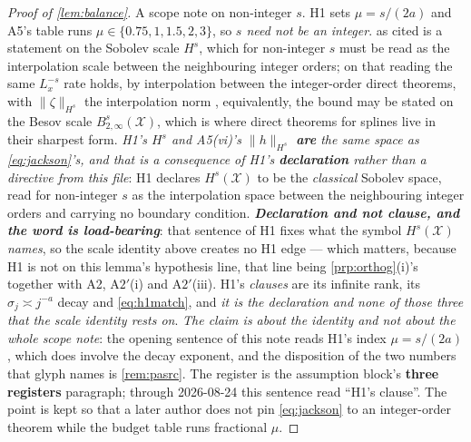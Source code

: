 \begin{proof}[Proof of \cref{lem:balance}]
A scope note on non-integer $s$. H1 sets $\mu=s/(2a)$ and A5's table runs
$\mu\in\{0.75,1,1.5,2,3\}$, so \emph{$s$ need not be an integer}.  as cited is a
statement on the Sobolev scale $H^{s}$, which for non-integer $s$ must be read as the interpolation
scale between the neighbouring integer orders; on that reading the same $L_x^{-s}$ rate holds, by
interpolation between the integer-order direct theorems, with $\|\zeta\|_{H^{s}}$ the interpolation norm
, equivalently, the bound may be stated on the Besov scale $B^{s}_{2,\infty}(\mathcal X)$, which is
where direct theorems for splines live in their sharpest form. \emph{H1's $H^{s}$ and A5(vi)'s
$\|h\|_{H^{s}}$ \textbf{are} the same space as \eqref{eq:jackson}'s, and that is a consequence of H1's
\textbf{declaration} rather than a directive from this file}: H1 declares $H^{s}(\mathcal X)$ to be the
\emph{classical} Sobolev
space, read for non-integer $s$ as the interpolation space between the neighbouring integer orders and
carrying no boundary condition. \emph{\textbf{Declaration and not clause, and the word is load-bearing}}:
that sentence of H1 fixes what the symbol $H^{s}(\mathcal X)$ \emph{names}, so the scale identity above
creates no H1 edge --- which matters, because H1 is not on this lemma's hypothesis line, that line being
\cref{prp:orthog}\textup{(i)}'s together with A2, A$2'$(i) and A$2'$(iii). H1's \emph{clauses} are its
infinite rank, its $\sigma_j\asymp j^{-a}$ decay and \eqref{eq:h1match}, and \emph{it is the declaration
and none of those three that the scale identity rests on}. \emph{The claim is about the identity and not
about the whole scope note}: the opening sentence of this note reads H1's index $\mu=s/(2a)$, which does
involve the decay exponent, and the disposition of the two numbers that glyph names is
\cref{rem:pasrc}. The register is the assumption block's
\textbf{three registers} paragraph; through 2026-08-24 this sentence read ``H1's clause''.
The point is kept so that a later author does not pin
\eqref{eq:jackson} to an integer-order theorem while the budget table runs fractional $\mu$.


\end{proof}
